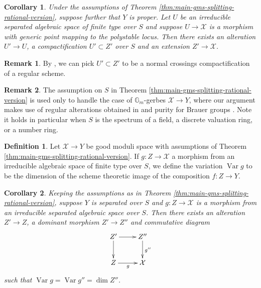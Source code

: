 \documentclass{amsart}
\newtheorem{corollary}[corollary]{Corollary}
\theoremstyle{definition}
\newtheorem{definition}[definition]{Definition}
\newtheorem{remark}[remark]{Remark}
\newcommand{\bG}{\mathbb{G}}
\newcommand{\cX}{\mathcal{X}}
\DeclareMathOperator{\Var}{Var}
\begin{document}
	\begin{corollary}\label{cor:compactification}
		Under the assumptions of Theorem \ref{thm:main-gms-splitting-rational-version}, suppose further that $Y$ is proper. Let $U$ be an irreducible separated algebraic space of finite type over $S$ and suppose $U \to \cX$ is a morphism with generic point mapping to the polystable locus. Then there exists an alteration $U' \to U$, a compactification $U' \subset Z'$ over $S$ and an extension $Z' \to \cX$. 
	\end{corollary}
	
	\begin{remark}
		By \cite[Theorem 1.2.5]{Temkin2017}, we can pick $U' \subset Z'$ to be a normal crossings compactification of a regular scheme. 
	\end{remark}
	
	\begin{remark}
		The assumption on $S$ in Theorem \ref{thm:main-gms-splitting-rational-version} is used only to handle the case of $\bG_m$-gerbes $\cX\to Y$, where our argument makes use of regular alterations obtained in \cite[Theorem 1.2.5]{Temkin2017} and purity for Brauer groups \cite[Theorem 3.5.4]{ColliotTheleneSkorobogatov}. Note it holds in particular when $S$ is the spectrum of a field, a discrete valuation ring, or a number ring. 
	\end{remark}
	
	\begin{definition}\label{def:variation}
		Let $\cX \to Y$ be good moduli space with assumptions of Theorem \ref{thm:main-gms-splitting-rational-version}. If $g \colon Z \to \cX$ a morphism from an irreducible algebraic space of finite type over $S$, we define the variation $\Var g$ to be the dimension of the scheme theoretic image of the composition $f \colon Z \to Y$. 
	\end{definition}
	
	\begin{corollary}\label{cor:variation}
		Keeping the assumptions as in Theorem \ref{thm:main-gms-splitting-rational-version}, suppose $Y$ is separated over $S$ and $g \colon Z \to \cX$ is a morphism from an irreducible separated algebraic space over $S$. Then there exists an alteration $Z' \to Z$, a dominant morphism $Z' \to Z''$ and commutative diagram
		$$
		\xymatrix{Z' \ar[r] \ar[d] & Z'' \ar[d]^{g''} \\ Z \ar[r]_g & \cX}
		$$
		such that $\Var g = \Var g'' = \dim Z''$.
	\end{corollary}
	
\end{document}

